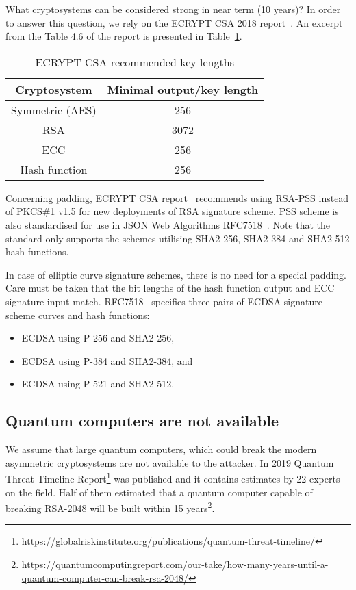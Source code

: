 What cryptosystems can be considered strong in near term (10 years)? In order to answer this question, we rely on the ECRYPT CSA 2018 report~\cite{ECRYPT-CSA}. An excerpt from the Table 4.6 of the report is presented in Table~\ref{tab:keylengths}.

\begin{table}[ht]
    \begin{center}
        \caption{ECRYPT CSA recommended key lengths}
        \label{tab:keylengths}
        \begin{tabular}{|c|c|}
            \hline
            Cryptosystem    & Minimal output/key length\\
            \hline
            \hline
            Symmetric (AES) & 256 \\
            RSA             & 3072\\
            ECC             & 256\\
            Hash function   & 256\\
            \hline
        \end{tabular}
    \end{center}
\end{table}

Concerning padding, ECRYPT CSA report~\cite{ECRYPT-CSA} recommends using RSA-PSS instead of PKCS\#1 v1.5 for new deployments of RSA signature scheme. PSS scheme is also standardised for use in JSON Web Algorithms RFC7518~\cite{RFC7518}. Note that the standard only supports the schemes utilising SHA2-256, SHA2-384 and SHA2-512 hash functions.

In case of elliptic curve signature schemes, there is no need for a special padding. Care must be taken that the bit lengths of the hash function output and ECC signature input match. RFC7518~\cite{RFC7518} specifies three pairs of ECDSA signature scheme curves and hash functions:
\begin{itemize}
    \item ECDSA using P-256 and SHA2-256,
    \item ECDSA using P-384 and SHA2-384, and
    \item ECDSA using P-521 and SHA2-512.
\end{itemize}

\subsection{Quantum computers are not available} 
We assume that large quantum computers, which could break the modern asymmetric cryptosystems are not available to the attacker. In 2019 Quantum Threat Timeline Report\footnote{\url{https://globalriskinstitute.org/publications/quantum-threat-timeline/}} was published and it contains estimates by 22 experts on the field. Half of them estimated that  a quantum computer capable of breaking RSA-2048 will be built within 15 years\footnote{\url{https://quantumcomputingreport.com/our-take/how-many-years-until-a-quantum-computer-can-break-rsa-2048/}}. 

